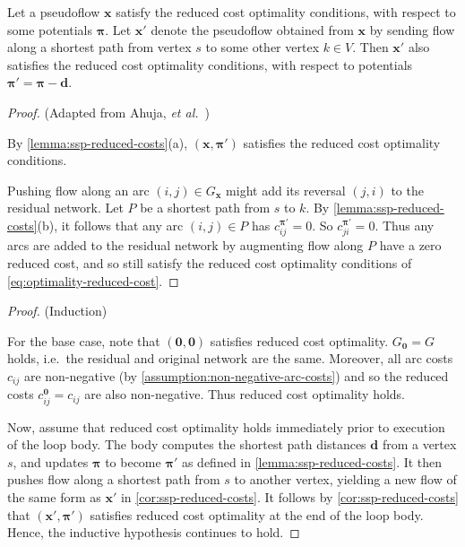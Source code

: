 \begin{cor} \label{cor:ssp-reduced-costs}
    Let a pseudoflow $\mathbf{x}$ satisfy the reduced cost optimality conditions, with respect to some potentials $\boldsymbol{\pi}$. Let $\mathbf{x}'$ denote the pseudoflow obtained from $\mathbf{x}$ by sending flow along a shortest path from vertex $s$ to some other vertex $k \in V$. Then $\mathbf{x}'$ also satisfies the reduced cost optimality conditions, with respect to potentials $\boldsymbol{\pi}' = \boldsymbol{\pi} - \mathbf{d}$.
\end{cor}
\begin{proof} (Adapted from Ahuja, \textit{et al.}~\cite[lemma~9.12]{Ahuja:1993})
    
    By \cref{lemma:ssp-reduced-costs}(a), $\left(\mathbf{x},\boldsymbol{\pi'}\right)$ satisfies the reduced cost optimality conditions.
    
    Pushing flow along an arc $(i,j) \in G_{\mathbf{x}}$ might add its reversal $(j,i)$ to the residual network. Let $P$ be a shortest path from $s$ to $k$. By \cref{lemma:ssp-reduced-costs}(b), it follows that any arc $(i,j) \in P$ has $c^{\boldsymbol{\pi}'}_{ij} = 0$. So $c^{\boldsymbol{\pi}'}_{ji} = 0$. Thus any arcs are added to the residual network by augmenting flow along $P$ have a zero reduced cost, and so still satisfy the reduced cost optimality conditions of \cref{eq:optimality-reduced-cost}.
\end{proof}

\sspinvariant*
\begin{proof} (Induction)
    
    For the base case, note that $(\mathbf{0},\mathbf{0})$ satisfies reduced cost optimality. $G_{\boldsymbol{0}} = G$ holds, i.e.\ the residual and original network are the same. Moreover, all arc costs $c_{ij}$ are non-negative (by \cref{assumption:non-negative-arc-costs}) and so the reduced costs $c^{\boldsymbol{0}}_{ij}=c_{ij}$ are also non-negative. Thus reduced cost optimality holds.
    
    Now, assume that reduced cost optimality holds immediately prior to execution of the loop body. The body computes the shortest path distances $\mathbf{d}$ from a vertex $s$, and updates $\boldsymbol{\pi}$ to become $\boldsymbol{\pi'}$ as defined in \cref{lemma:ssp-reduced-costs}. It then pushes flow along a shortest path from $s$ to another vertex, yielding a new flow of the same form as $\mathbf{x'}$ in \cref{cor:ssp-reduced-costs}. It follows by \cref{cor:ssp-reduced-costs} that $(\mathbf{x}',\boldsymbol{\pi}')$ satisfies reduced cost optimality at the end of the loop body. Hence, the inductive hypothesis continues to hold.
\end{proof}

